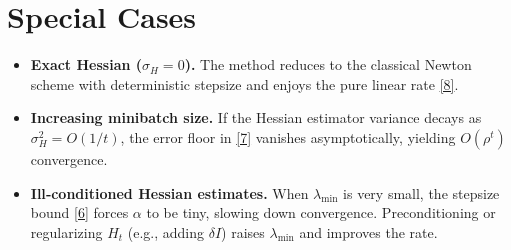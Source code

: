 \documentclass{article}
\begin{document}
\section*{Special Cases}
\begin{itemize}
\item \textbf{Exact Hessian ($\sigma_{H}=0$).} The method reduces to the classical Newton scheme with deterministic stepsize and enjoys the pure linear rate \eqref{8}.
\item \textbf{Increasing minibatch size.} If the Hessian estimator variance decays as $\sigma_{H}^{2}=O(1/t)$, the error floor in \eqref{7} vanishes asymptotically, yielding $O(\rho^{t})$ convergence.
\item \textbf{Ill‑conditioned Hessian estimates.} When $\lambda_{\min}$ is very small, the stepsize bound \eqref{6} forces $\alpha$ to be tiny, slowing down convergence.  Preconditioning or regularizing $H_{t}$ (e.g., adding $\delta I$) raises $\lambda_{\min}$ and improves the rate.
\end{itemize}
\end{document}
